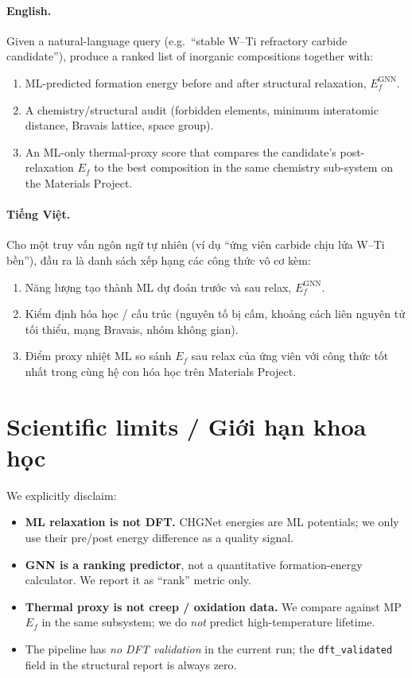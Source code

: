 \documentclass[11pt,a4paper]{report}
\begin{document}
\paragraph{English.}
Given a natural-language query (e.g.\ ``stable W--Ti refractory carbide candidate''), produce
a ranked list of inorganic compositions together with:
\begin{enumerate}[leftmargin=*,itemsep=2pt]
\item ML-predicted formation energy before and after structural relaxation, $E_f^{\text{GNN}}$.
\item A chemistry/structural audit (forbidden elements, minimum interatomic distance, Bravais
      lattice, space group).
\item An ML-only thermal-proxy score that compares the candidate's post-relaxation $E_f$ to
      the best composition in the same chemistry sub-system on the Materials Project.
\end{enumerate}

\paragraph{Tiếng Việt.}
Cho một truy vấn ngôn ngữ tự nhiên (ví dụ ``ứng viên carbide chịu lửa W--Ti bền''), đầu ra
là danh sách xếp hạng các công thức vô cơ kèm:
\begin{enumerate}[leftmargin=*,itemsep=2pt]
\item Năng lượng tạo thành ML dự đoán trước và sau relax, $E_f^{\text{GNN}}$.
\item Kiểm định hóa học / cấu trúc (nguyên tố bị cấm, khoảng cách liên nguyên tử tối thiểu,
      mạng Bravais, nhóm không gian).
\item Điểm proxy nhiệt ML so sánh $E_f$ sau relax của ứng viên với công thức tốt nhất
      trong cùng hệ con hóa học trên Materials Project.
\end{enumerate}

\section{Scientific limits / Giới hạn khoa học}

We explicitly disclaim:
\begin{itemize}[leftmargin=*,itemsep=2pt]
\item \textbf{ML relaxation is not DFT.} CHGNet energies are ML potentials; we only use
      their pre/post energy difference as a quality signal.
\item \textbf{GNN is a ranking predictor}, not a quantitative formation-energy calculator.
      We report it as ``rank'' metric only.
\item \textbf{Thermal proxy is not creep / oxidation data.} We compare against MP $E_f$ in
      the same subsystem; we do \emph{not} predict high-temperature lifetime.
\item The pipeline has \emph{no DFT validation} in the current run; the
      \texttt{dft\_validated} field in the structural report is always zero.
\end{itemize}
\end{document}
